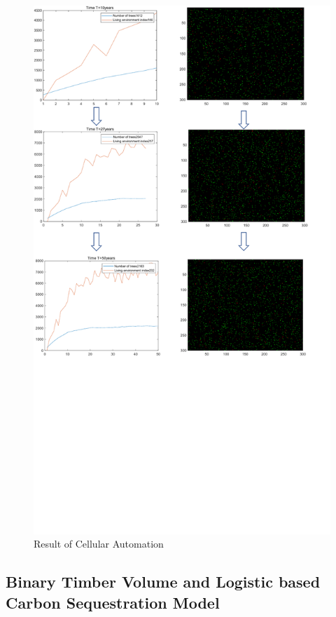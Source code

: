\documentclass{mcmthesis}
\numberwithin{figure}{section}
\numberwithin{table}{section}
\numberwithin{equation}{section}
\begin{document}
\begin{figure}[htb]
  \centering
  \includegraphics[width = 14cm]{code&pic/CA-pic.pdf}
  \caption{Result of Cellular Automation}\label{CA_Result}
\end{figure}

\subsection{Binary Timber Volume and Logistic based Carbon Sequestration Model}
\end{document}

